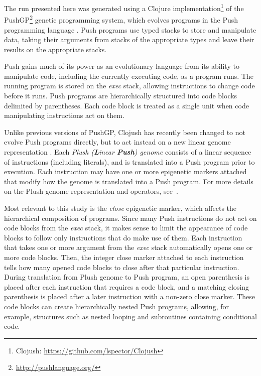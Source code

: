 \documentclass[graybox]{svmult}
\begin{document}
The run presented here was generated using a Clojure implementation\footnote{Clojush: \url{https://github.com/lspector/Clojush}} of the PushGP\footnote{\url{http://pushlanguage.org/}} genetic programming system, which evolves programs in the Push programming language \cite{spector:2002:GPEM, 1068292}. Push programs use typed stacks to store and manipulate data, taking their arguments from stacks of the appropriate types and leave their results on the appropriate stacks.

Push gains much of its power as an evolutionary language from its ability to manipulate code, including the currently executing code, as a program runs. The running program is stored on the \emph{exec} stack, allowing instructions to change code before it runs. Push programs are hierarchically structured into code blocks delimited by parentheses. Each code block is treated as a single unit when code manipulating instructions act on them.

Unlike previous versions of PushGP, Clojush has recently been changed to not evolve 
Push programs directly, but to act instead on a new linear genome representation 
\cite{Helmuth:2016:GPTP}. Each \emph{Plush (\textbf{L}inear 
	\textbf{Push}) genome} consists of a linear sequence of instructions (including 
literals), and is translated into a Push program prior to execution. Each 
instruction may have one or more epigenetic markers attached that modify how 
the genome is translated into a Push program. For more details on the Plush genome
representation and operators, see~\cite{Helmuth:2016:GPTP}.

Most relevant to this study is the \emph{close} epigenetic marker, which 
affects the hierarchical composition of programs. Since many Push instructions 
do not act on code blocks from the \emph{exec} stack, it 
makes sense to limit the appearance of code blocks to follow only instructions 
that do make use of them. Each instruction that takes one or more argument from 
the \emph{exec} stack automatically opens one or more code blocks. Then, the 
integer close marker attached to each instruction tells how many opened code 
blocks to close after that particular instruction. During translation from Plush genome to 
Push program, an open parenthesis is placed after each instruction that 
requires a code block, and a matching closing parenthesis is placed after a 
later instruction with a non-zero close marker. These code blocks can create 
hierarchically nested Push programs, allowing, for example, structures such as 
nested looping and subroutines containing conditional code.
\end{document}
